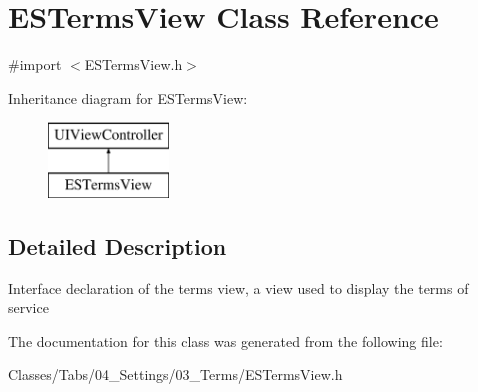 \hypertarget{interface_e_s_terms_view}{}\section{E\+S\+Terms\+View Class Reference}
\label{interface_e_s_terms_view}


{\ttfamily \#import $<$E\+S\+Terms\+View.\+h$>$}

Inheritance diagram for E\+S\+Terms\+View\+:\begin{figure}[H]
\begin{center}
\leavevmode
\includegraphics[height=2.000000cm]{interface_e_s_terms_view}
\end{center}
\end{figure}


\subsection{Detailed Description}
Interface declaration of the terms view, a view used to display the terms of service 

The documentation for this class was generated from the following file\+:\begin{DoxyCompactItemize}
\item 
Classes/\+Tabs/04\+\_\+\+Settings/03\+\_\+\+Terms/E\+S\+Terms\+View.\+h\end{DoxyCompactItemize}
